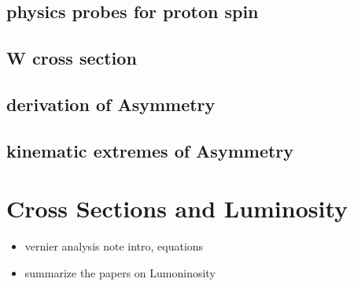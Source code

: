 \subsection{ physics probes for proton spin}
\subsection{ W cross section}
\subsection{ derivation of Asymmetry}
\subsection{ kinematic extremes of Asymmetry}

\clearpage
\section{Cross Sections and Luminosity}
\begin{itemize}
		\item vernier analysis note intro, equations
		\item summarize the papers on Lumoninosity
\end{itemize}

\clearpage
